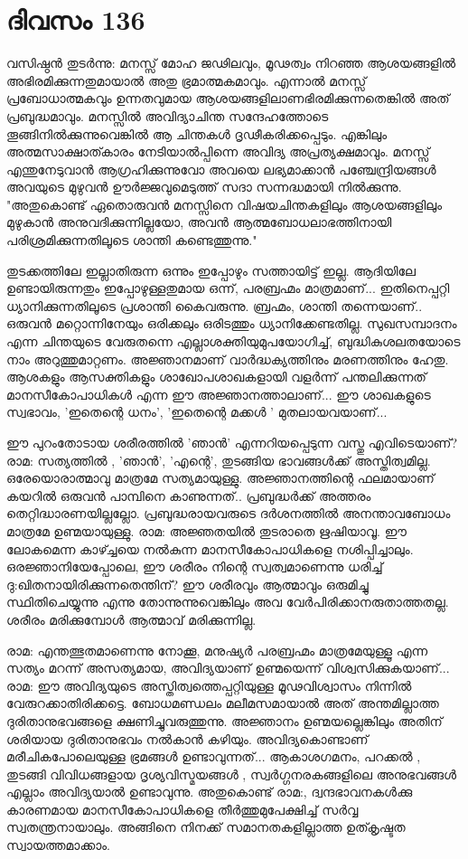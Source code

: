 \newpage
\section{ദിവസം 136}


വസിഷ്ഠന്‍ തുടര്‍ന്നു: മനസ്സ്‌ മോഹ ജഢിലവും, മൂഢത്വം നിറഞ്ഞ ആശയങ്ങളില്‍ അഭിരമിക്കുന്നതുമായാല്‍ അതു ഭ്രമാത്മകമാവും. എന്നാല്‍ മനസ്സ്‌ പ്രബോധാത്മകവും ഉന്നതവുമായ ആശയങ്ങളിലാണഭിരമിക്കുന്നതെങ്കില്‍ അത്‌ പ്രബുദ്ധമാവും. മനസ്സില്‍ അവിദ്യാചിന്ത സന്ദേഹത്തോടെ തൂങ്ങിനില്‍ക്കുന്നുവെങ്കില്‍ ആ ചിന്തകള്‍ ദൃഢീകരിക്കപ്പെടും. എങ്കിലും അത്മസാക്ഷാത്കാരം നേടിയാല്‍പ്പിന്നെ അവിദ്യ അപ്രത്യക്ഷമാവും. മനസ്സ്‌ എന്തുനേടുവാന്‍ ആഗ്രഹിക്കുന്നുവോ അവയെ ലഭ്യമാക്കാന്‍ പഞ്ചേന്ദ്രിയങ്ങള്‍ അവയുടെ മുഴുവന്‍ ഊര്‍ജ്ജവുമെടുത്ത്‌ സദാ സന്നദ്ധമായി നില്‍ക്കുന്നു. "അതുകൊണ്ട്‌ ഏതൊരുവന്‍ മനസ്സിനെ വിഷയചിന്തകളിലും ആശയങ്ങളിലും മുഴുകാന്‍ അനുവദിക്കുന്നില്ലയോ, അവന്‍ ആത്മബോധലാഭത്തിനായി പരിശ്രമിക്കുന്നതിലൂടെ ശാന്തി കണ്ടെത്തുന്നു."

തുടക്കത്തിലേ ഇല്ലാതിരുന്ന ഒന്നും ഇപ്പോഴും സത്തായിട്ട്‌ ഇല്ല. ആദിയിലേ ഉണ്ടായിരുന്നതും ഇപ്പോഴുള്ളതുമായ ഒന്ന്, പരബ്രഹ്മം മാത്രമാണ്‌...  ഇതിനെപ്പറ്റി ധ്യാനിക്കുന്നതിലൂടെ പ്രശാന്തി കൈവരുന്നു. ബ്രഹ്മം, ശാന്തി തന്നെയാണ്‌.. ഒരുവന്‍ മറ്റൊന്നിനേയും ഒരിക്കലും ഒരിടത്തും ധ്യാനിക്കേണ്ടതില്ല. സുഖസമ്പാദനം എന്ന ചിന്തയുടെ വേരുതന്നെ എല്ലാശക്തിയുമുപയോഗിച്ച്‌, ബുദ്ധികുശലതയോടെ നാം അറുത്തുമാറ്റണം. അജ്ഞാനമാണ്‌ വാര്‍ദ്ധക്യത്തിനും മരണത്തിനും ഹേതു. ആശകളും ആസക്തികളും ശാഖോപശാഖകളായി വളര്‍ന്ന് പന്തലിക്കുന്നത്‌ മാനസീകോപാധികള്‍ എന്ന ഈ അജ്ഞാനത്താലാണ്‌...  ഈ ശാഖകളുടെ സ്വഭാവം, 'ഇതെന്റെ ധനം', 'ഇതെന്റെ മക്കള്‍ ' മുതലായവയാണ്‌...

ഈ പുറംതോടായ ശരീരത്തില്‍ 'ഞാന്‍' എന്നറിയപ്പെടുന്ന വസ്തു എവിടെയാണ്‌? രാമ: സത്യത്തില്‍ , 'ഞാന്‍', 'എന്റെ', തുടങ്ങിയ ഭാവങ്ങള്‍ക്ക്‌ അസ്തിത്വമില്ല. ഒരേയൊരാത്മാവു മാത്രമേ സത്യമായുള്ളു. അജ്ഞാനത്തിന്റെ ഫലമായാണ്‌ കയറില്‍ ഒരുവന്‍ പാമ്പിനെ കാണുന്നത്‌..  പ്രബുദ്ധര്‍ക്ക്‌ അത്തരം തെറ്റിദ്ധാരണയില്ലല്ലോ. പ്രബുദ്ധരായവരുടെ ദര്‍ശനത്തില്‍ അനന്താവബോധം മാത്രമേ ഉണ്മയായുള്ളു. രാമ: അജ്ഞതയില്‍ തുടരാതെ ഋഷിയാവൂ. ഈ ലോകമെന്ന കാഴ്ച്ചയെ നല്‍കുന്ന മാനസീകോപാധികളെ നശിപ്പിച്ചാലും. ഒരജ്ഞാനിയേപ്പോലെ, ഈ ശരീരം നിന്റെ സ്വത്വമാണെന്നു ധരിച്ച്‌ ദു:ഖിതനായിരിക്കുന്നതെന്തിന്‌? ഈ ശരീരവും ആത്മാവും ഒരുമിച്ചു സ്ഥിതിചെയ്യുന്നു എന്നു തോന്നുന്നുവെങ്കിലും അവ വേര്‍പിരിക്കാനരുതാത്തതല്ല. ശരീരം മരിക്കുമ്പോള്‍ ആത്മാവ്‌ മരിക്കുന്നില്ല.

രാമ: എന്തത്ഭുതമാണെന്നു നോക്കൂ, മനുഷ്യര്‍ പരബ്രഹ്മം മാത്രമേയുള്ളൂ എന്ന സത്യം മറന്ന് അസത്യമായ, അവിദ്യയാണ്‌ ഉണ്മയെന്ന് വിശ്വസിക്കുകയാണ്‌...  രാമ: ഈ അവിദ്യയുടെ അസ്തിത്വത്തെപ്പറ്റിയുള്ള മൂഢവിശ്വാസം നിന്നില്‍ വേരുറക്കാതിരിക്കട്ടെ. ബോധമണ്ഡലം മലീമസമായാല്‍ അത്‌ അന്തമില്ലാത്ത ദുരിതാനുഭവങ്ങളെ ക്ഷണിച്ചുവരുത്തുന്നു. അജ്ഞാനം ഉണ്മയല്ലെങ്കിലും അതിന്‌ ശരിയായ ദുരിതാനുഭവം നല്‍കാന്‍ കഴിയും. അവിദ്യകൊണ്ടാണ്‌ മരീചികപോലെയുള്ള ഭ്രമങ്ങള്‍ ഉണ്ടാവുന്നത്‌...  ആകാശഗമനം, പറക്കല്‍ , തുടങ്ങി വിവിധങ്ങളായ ദൃശ്യവിസ്മയങ്ങള്‍ , സ്വര്‍ഗ്ഗനരകങ്ങളിലെ അനുഭവങ്ങള്‍ എല്ലാം അവിദ്യയാല്‍ ഉണ്ടാവുന്നു. അതുകൊണ്ട്‌ രാമ:, ദ്വന്ദഭാവനകള്‍ക്കു കാരണമായ മാനസീകോപാധികളെ തീര്‍ത്തുമുപേക്ഷിച്ച്‌ സര്‍വ്വ സ്വതന്ത്രനായാലും. അങ്ങിനെ നിനക്ക്‌ സമാനതകളില്ലാത്ത ഉത്കൃഷ്ടത സ്വായത്തമാക്കാം. 

